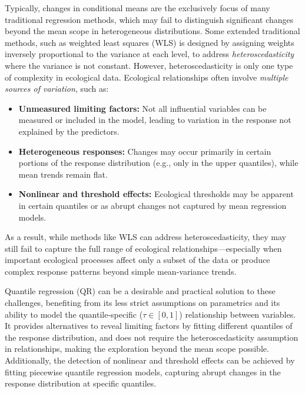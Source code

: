 Typically, changes in conditional means are the exclusively focus
of many traditional regression methods, which may fail to distinguish
significant changes beyond the mean scope in heterogeneous distributions.
Some extended traditional methods, such as weighted least squares (WLS) is designed by assigning weights inversely 
proportional to the variance at each level, to address \emph{heteroscedasticity} where the variance is not constant.
However, heteroscedasticity is only one type of complexity in ecological data\cite{Cade2003}. Ecological relationships often involve \emph{multiple sources of variation}, such as:
\begin{itemize}
    \item \textbf{Unmeasured limiting factors:} Not all influential variables can be measured or included in the model, leading to variation in the response not explained by the predictors.
    \item \textbf{Heterogeneous responses:} Changes may occur primarily in certain portions of the response distribution (e.g., only in the upper quantiles), while mean trends remain flat.
    \item \textbf{Nonlinear and threshold effects:} Ecological thresholds may be apparent in certain quantiles or as abrupt changes not captured by mean regression models.
\end{itemize}
As a result, while methods like WLS can address heteroscedasticity, they may still fail to capture the 
full range of ecological relationships—especially when important ecological processes affect 
only a subset of the data or produce complex response patterns beyond simple mean-variance trends.

Quantile regression (QR) can be a desirable and practical solution to these challenges, benefiting from its 
less strict assumptions on parametrics and its ability to model the quantile-specific (\(\tau \in [0, 1]\)) relationship between 
variables\cite{Huang2017}. It provides alternatives to reveal limiting factors by fitting different quantiles of the response distribution, 
and does not require the heteroscedasticity assumption in relationships, making the exploration beyond the mean scope possible.
Additionally, the detection of nonlinear and threshold effects can be achieved by fitting piecewise quantile regression models,
capturing abrupt changes in the response distribution at specific quantiles.


